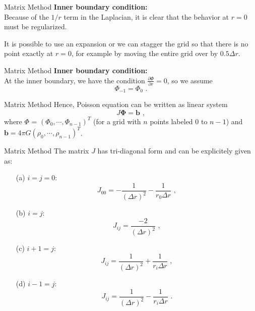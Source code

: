 \documentclass[11pt]{beamer}
\begin{document}
\begin{frame}[fragile]{Matrix Method}
\textbf{Inner boundary condition:}\\
Because of the $1/r$ term in the Laplacian, it is clear that the behavior 
 at $r=0$ must be regularized. \\
 \bigskip
 
 It is possible to use an expansion or we can
stagger the grid so that there is no point exactly at $r=0$, for example 
by moving the entire grid over by $0.5 \Delta r$.  \\
\end{frame}

\begin{frame}[fragile]{Matrix Method}
\textbf{Inner boundary condition:}\\
At the inner boundary, we have the condition $\frac{\partial \Phi}{ \partial r} = 0$, so we assume
\begin{equation}
\Phi_{-1} = \Phi_{0}\,\,.
\end{equation}
\end{frame}

\begin{frame}[fragile]{Matrix Method}
Hence, Poisson equation can be written as linear system
\begin{equation}
J \mathbf{\Phi} = \mathbf{b}\,\,,
\label{eq:pde_poisson2}
\end{equation}
where $\Phi$ = $(\Phi_0, \cdots , \Phi_{n-1})^T$ (for a grid with $n$
points labeled $0$ to $n-1$) and  $\mathbf{b} = 4\pi G
(\rho_0, \cdots , \rho_{n-1})^T$. 
\end{frame}

\begin{frame}[fragile]{Matrix Method}
The matrix $J$ has tri-diagonal form and can be explicitely given as:
\begin{itemize}
\item[(a)] $i=j=0$:
\begin{equation}
J_{00} = - \frac{1}{(\Delta r)^2} - \frac{1}{r_0 \Delta r}\,\,,
\end{equation}
\item[(b)] $i=j$:
\begin{equation}
J_{ij} = \frac{-2}{(\Delta r)^2}\,\,,
\end{equation}
\item[(c)] $i+1=j$:
\begin{equation}
J_{ij} = \frac{1}{(\Delta r)^2} + \frac{1}{r_i \Delta r}\,\,,
\end{equation}
\item[(d)] $i-1=j$:
\begin{equation}
J_{ij} = \frac{1}{(\Delta r)^2} - \frac{1}{r_i \Delta r}\,\,.
\end{equation}
\end{itemize}
\end{frame}
\end{document}
